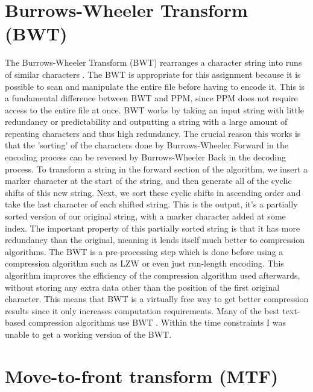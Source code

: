 \documentclass[a4paper, 11pt]{article}
\numberwithin{equation}{section}
\begin{document}
\section{Burrows-Wheeler Transform (BWT)}
The Burrows-Wheeler Transform (BWT) rearranges a character string into runs of similar characters \cite{burrows1994block}. 
The BWT is appropriate for this assignment because it is possible to scan and manipulate the entire file 
before having to encode it. 
This is a fundamental difference between BWT and PPM, since PPM does not require access to the entire file 
at once. 
BWT works by taking an input string with little redundancy or predictability and outputting a string with 
a large amount of repeating characters and thus high redundancy. 
The crucial reason this works is that the 'sorting' of the characters done by Burrows-Wheeler Forward 
in the encoding process can be reversed by Burrows-Wheeler Back in the decoding process. 
To transform a string in the forward section of the algorithm, we insert a marker character at the start 
of the string, and then generate all of the cyclic shifts of this new string. 
Next, we sort these cyclic shifts in ascending order and take the last character of each shifted string. 
This is the output, it's a partially sorted version of our original string, with a marker character added 
at some index. 
The important property of this partially sorted string is that it has more redundancy than the original, 
meaning it lends itself much better to compression algorithms. 
The BWT is a pre-processing step which is done before using a compression algorithm such as LZW or 
even just run-length encoding. 
This algorithm improves the efficiency of the compression algorithm used afterwards, without storing 
any extra data other than the position of the first original character. 
This means that BWT is a virtually free way to get better compression results since it only increases 
computation requirements. 
Many of the best text-based compression algorithms use BWT \cite{TextBenchmark}. 
Within the time constraints I was unable to get a working version of the BWT. 


\section{Move-to-front transform (MTF)}
\end{document}
